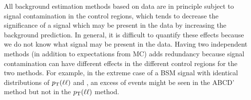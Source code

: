 All background estimation methods based on data are in principle subject to signal contamination
in the control regions, which tends to decrease the significance of a signal
which may be present in the data by increasing the background prediction.
In general, it is difficult to quantify these effects because we 
do not know what signal may be present in the data.  Having two
independent methods (in addition to expectations from MC)
adds redundancy because signal contamination can have different effects
in the different control regions for the two methods.
For example, in the extreme case of a
BSM signal with identical distributions of $p_{\mathrm{T}}(\ell \ell)$ and \MET, an excess of events might be seen 
in the ABCD' method but not in the $p_{\mathrm{T}}(\ell \ell)$ method.


